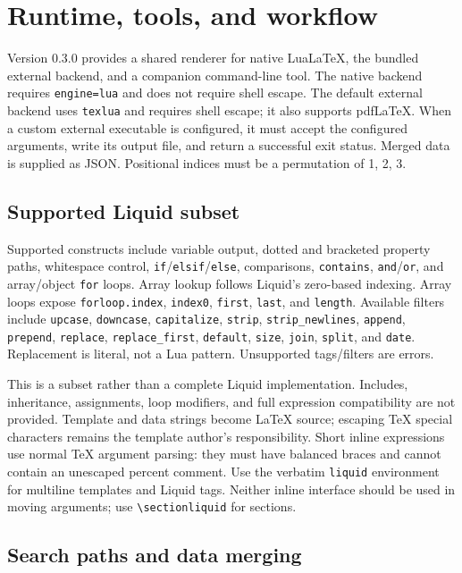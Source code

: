 \section{Runtime, tools, and workflow}
\label{sec:runtime}

Version 0.3.0 provides a shared renderer for native LuaLaTeX, the bundled external
backend, and a companion command-line tool. The native backend requires
\texttt{engine=lua} and does not require shell escape. The default external
backend uses \texttt{texlua} and requires shell escape; it also supports pdfLaTeX.
When a custom external executable is configured, it must accept the configured
arguments, write its output file, and return a successful exit status. Merged data
is supplied as JSON. Positional indices must be a permutation of 1, 2, 3.

\subsection{Supported Liquid subset}

Supported constructs include variable output, dotted and bracketed property
paths, whitespace control, \texttt{if}/\texttt{elsif}/\texttt{else}, comparisons,
\texttt{contains}, \texttt{and}/\texttt{or}, and array/object \texttt{for} loops.
Array lookup follows Liquid's zero-based indexing. Array loops expose
\texttt{forloop.index}, \texttt{index0}, \texttt{first}, \texttt{last}, and
\texttt{length}. Available filters include \texttt{upcase}, \texttt{downcase},
\texttt{capitalize}, \texttt{strip}, \texttt{strip\_newlines}, \texttt{append},
\texttt{prepend}, \texttt{replace}, \texttt{replace\_first}, \texttt{default},
\texttt{size}, \texttt{join}, \texttt{split}, and \texttt{date}. Replacement is
literal, not a Lua pattern. Unsupported tags/filters are errors.

This is a subset rather than a complete Liquid implementation. Includes,
inheritance, assignments, loop modifiers, and full expression compatibility are
not provided. Template and data strings become LaTeX source; escaping TeX special
characters remains the template author's responsibility. Short inline expressions
use normal TeX argument parsing: they must have balanced braces and cannot contain
an unescaped percent comment. Use the verbatim \texttt{liquid} environment for
multiline templates and Liquid tags. Neither inline interface should be used in
moving arguments; use \verb|\sectionliquid| for sections.

\subsection{Search paths and data merging}

